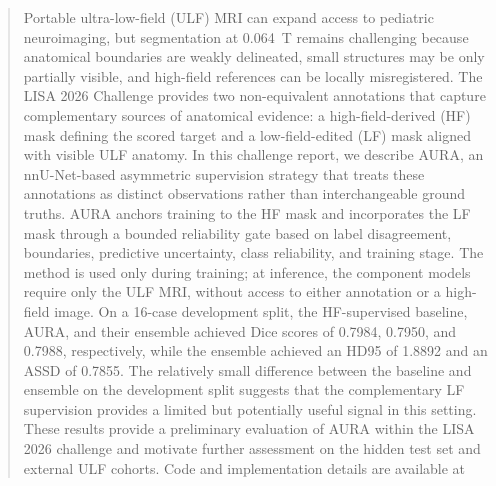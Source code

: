 \documentclass[runningheads]{llncs}
\begin{document}
\begin{abstract}


Portable ultra-low-field (ULF) MRI can expand access to pediatric neuroimaging, but segmentation at 0.064~T remains challenging because anatomical boundaries are weakly delineated, small structures may be only partially visible, and high-field references can be locally misregistered. The LISA 2026 Challenge provides two non-equivalent annotations that capture complementary sources of anatomical evidence: a high-field-derived (HF) mask defining the scored target and a low-field-edited (LF) mask aligned with visible ULF anatomy. In this challenge report, we describe AURA, an nnU-Net-based asymmetric supervision strategy that treats these annotations as distinct observations rather than interchangeable ground truths. AURA anchors training to the HF mask and incorporates the LF mask through a bounded reliability gate based on label disagreement, boundaries, predictive uncertainty, class reliability, and training stage. The method is used only during training; at inference, the component models require only the ULF MRI, without access to either annotation or a high-field image. On a 16-case development split, the HF-supervised baseline, AURA, and their ensemble achieved Dice scores of 0.7984, 0.7950, and 0.7988, respectively, while the ensemble achieved an HD95 of 1.8892 and an ASSD of 0.7855. The relatively small difference between the baseline and ensemble on the development split suggests that the complementary LF supervision provides a limited but potentially useful signal in this setting. These results provide a preliminary evaluation of AURA within the LISA 2026 challenge and motivate further assessment on the hidden test set and external ULF cohorts. Code and implementation details are available at

\end{abstract}
\end{document}

